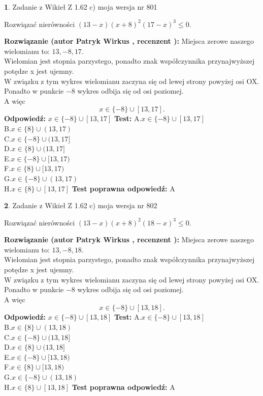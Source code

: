 \documentclass[12pt, a4paper]{article}
\theoremstyle{definition} %
\newtheorem{zad}{}
\newcommand{\zadStart}[1]{\begin{zad}#1\newline}
\newcommand{\zadStop}{\end{zad}}
\newcommand{\rozwStart}[2]{\noindent \textbf{Rozwiązanie (autor #1 , recenzent #2): }\newline}
\newcommand{\rozwStop}{\newline}
\newcommand{\odpStart}{\noindent \textbf{Odpowiedź:}\newline}
\newcommand{\odpStop}{\newline}
\newcommand{\testStart}{\noindent \textbf{Test:}\newline}
\newcommand{\testStop}{\newline}
\newcommand{\kluczStart}{\noindent \textbf{Test poprawna odpowiedź:}\newline}
\newcommand{\kluczStop}{\newline}
\begin{document}
\zadStart{Zadanie z Wikieł Z 1.62 c) moja wersja nr 801}

Rozwiązać nierówności $(13-x)(x+8)^{2}(17-x)^{3}\le0$.
\zadStop
\rozwStart{Patryk Wirkus}{}
Miejsca zerowe naszego wielomianu to: $13, -8, 17$.\\
Wielomian jest stopnia parzystego, ponadto znak współczynnika przy\linebreak najwyższej potędze x jest ujemny.\\ W związku z tym wykres wielomianu zaczyna się od lewej strony powyżej osi OX.\\
Ponadto w punkcie $-8$ wykres odbija się od osi poziomej.\\
A więc $$x \in \{-8\} \cup [13,17].$$
\rozwStop
\odpStart
$x \in \{-8\} \cup [13,17]$
\odpStop
\testStart
A.$x \in \{-8\} \cup [13,17]$\\
B.$x \in \{8\} \cup (13,17)$\\
C.$x \in \{-8\} \cup (13,17]$\\
D.$x \in \{8\} \cup (13,17]$\\
E.$x \in \{-8\} \cup [13,17)$\\
F.$x \in \{8\} \cup [13,17)$\\
G.$x \in \{-8\} \cup (13,17)$\\
H.$x \in \{8\} \cup [13,17]$
\testStop
\kluczStart
A
\kluczStop



\zadStart{Zadanie z Wikieł Z 1.62 c) moja wersja nr 802}

Rozwiązać nierówności $(13-x)(x+8)^{2}(18-x)^{3}\le0$.
\zadStop
\rozwStart{Patryk Wirkus}{}
Miejsca zerowe naszego wielomianu to: $13, -8, 18$.\\
Wielomian jest stopnia parzystego, ponadto znak współczynnika przy\linebreak najwyższej potędze x jest ujemny.\\ W związku z tym wykres wielomianu zaczyna się od lewej strony powyżej osi OX.\\
Ponadto w punkcie $-8$ wykres odbija się od osi poziomej.\\
A więc $$x \in \{-8\} \cup [13,18].$$
\rozwStop
\odpStart
$x \in \{-8\} \cup [13,18]$
\odpStop
\testStart
A.$x \in \{-8\} \cup [13,18]$\\
B.$x \in \{8\} \cup (13,18)$\\
C.$x \in \{-8\} \cup (13,18]$\\
D.$x \in \{8\} \cup (13,18]$\\
E.$x \in \{-8\} \cup [13,18)$\\
F.$x \in \{8\} \cup [13,18)$\\
G.$x \in \{-8\} \cup (13,18)$\\
H.$x \in \{8\} \cup [13,18]$
\testStop
\kluczStart
A
\kluczStop
\end{document}
